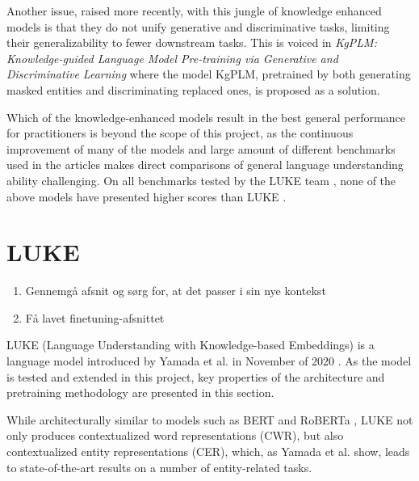 \documentclass[main.tex]{subfiles}
\begin{document}
Another issue, raised more recently, with this jungle of knowledge enhanced models is that they do not unify generative and discriminative tasks, limiting their generalizability to fewer downstream tasks.
This is voiced in \emph{KgPLM: Knowledge-guided Language Model Pre-training via Generative and Discriminative Learning} \cite{he2020kgplm} where the model KgPLM, pretrained by both generating masked entities and discriminating replaced ones, is proposed as a solution.

Which of the knowledge-enhanced models result in the best general performance for practitioners is beyond the scope of this project, as the continuous improvement of many of the models and large amount of different benchmarks used in the articles makes direct comparisons of general language understanding ability challenging.
On all benchmarks tested by the LUKE team \cite{yamada2020luke}, none of the above models have presented higher scores than LUKE \cite[Sec. 4]{yamada2020luke}.


\section{LUKE}
\label{sec:LUKE}
\begin{enumerate}
    \item Gennemgå afsnit og sørg for, at det passer i sin nye kontekst
    \item Få lavet finetuning-afsnittet
\end{enumerate}
LUKE (Language Understanding with Knowledge-based Embeddings) is a language model introduced by Yamada et al. in November of 2020 \cite{yamada2020luke}.
As the model is tested and extended in this project, key properties of the architecture and pretraining methodology are presented in this section.

While architecturally similar to models such as BERT \cite{devlin2019bert} and RoBERTa \cite{liu2019roberta}, LUKE not only produces contextualized word representations (CWR), but also contextualized entity representations (CER), which, as Yamada et al. show, leads to state-of-the-art results on a number of entity-related tasks.
\end{document}

